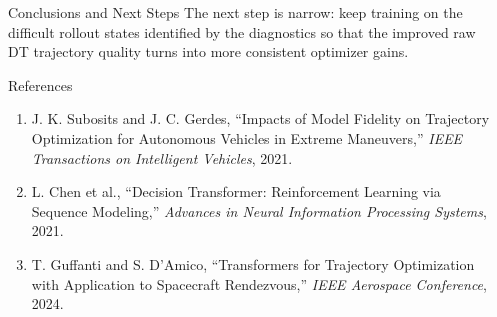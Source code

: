 \documentclass[final]{beamer}
\newlength{\sepwidth}
\newlength{\colwidth}
\newcommand{\separatorcolumn}{\begin{column}{\sepwidth}\end{column}}
\begin{document}
\begin{frame}[t]
\begin{columns}[t]
\begin{column}{\colwidth}
\begin{block}{Conclusions and Next Steps}
The next step is narrow: keep training on the difficult rollout states identified by the diagnostics so that the improved raw DT trajectory quality turns into more consistent optimizer gains.
\end{block}

\begin{block}{References}
\vspace{-12pt}
\footnotesize
\begin{enumerate}
  \item J. K. Subosits and J. C. Gerdes, ``Impacts of Model Fidelity on Trajectory Optimization for Autonomous Vehicles in Extreme Maneuvers,'' \textit{IEEE Transactions on Intelligent Vehicles}, 2021.
  \item L. Chen et al., ``Decision Transformer: Reinforcement Learning via Sequence Modeling,'' \textit{Advances in Neural Information Processing Systems}, 2021.
  \item T. Guffanti and S. D'Amico, ``Transformers for Trajectory Optimization with Application to Spacecraft Rendezvous,'' \textit{IEEE Aerospace Conference}, 2024.
\end{enumerate}
\end{block}

\end{column}

\separatorcolumn
\end{columns}
\end{frame}
\end{document}
